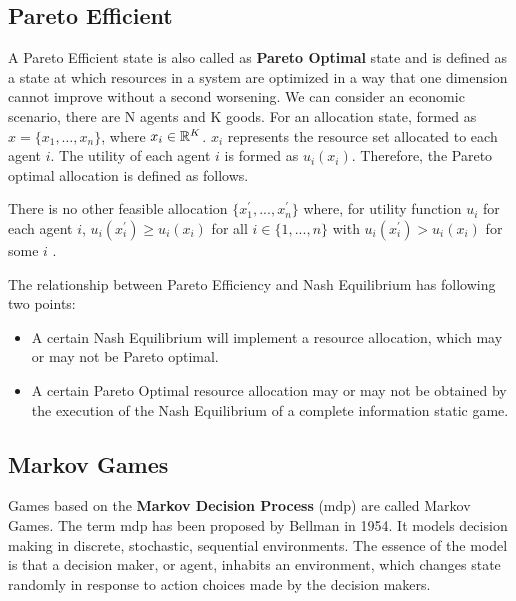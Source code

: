 \subsection{Pareto Efficient}
A Pareto Efficient state is also called as \textbf{Pareto Optimal} state and is defined as a state at which resources in a system are optimized in a way that one dimension cannot improve without a second worsening. We can consider an economic scenario, there are N agents and K goods. For an allocation state, formed as $x=\{x_1, \dots, x_n\}$, where $x_i \in \mathbb{R}^{K}$. $x_i$ represents the resource set allocated to each agent $i$. The utility of each agent $i$ is formed as $u_i(x_i)$. Therefore, the Pareto optimal allocation is defined as follows.

\begin{proposition}
There is no other feasible allocation $\{x_{1}^{\prime},...,x_{n}^{\prime}\}$ where, for 
utility function $u_i$ for each agent $i$, $u_{i}(x_{i}^{\prime}) \geqslant u_{i}(x_{i})$ for all $i \in \{1,...,n\}$ with $u_{i}(x_{i}^{\prime})>u_{i}(x_{i})$ for some $i$ \parencite{Whinston1989}.
\end{proposition}

The relationship between Pareto Efficiency and Nash Equilibrium has following two points:

\begin{itemize}
\item A certain Nash Equilibrium will implement a resource allocation, which may or may not be Pareto optimal.
\item A certain Pareto Optimal resource allocation may or may not be obtained by the execution of the Nash Equilibrium of a complete information static game.
\end{itemize}

\subsection{Markov Games} \label{background-game-theory-markov-game}
Games based on the \textbf{Markov Decision Process} (\gls{mdp}) are called Markov Games. The term \gls{mdp} has been proposed by Bellman in 1954\parencite{Bellma1954}. It models decision making in discrete, stochastic, sequential environments. The essence of the model is that a decision maker, or agent, inhabits an environment, which changes state randomly in response to action choices made by the decision makers.

